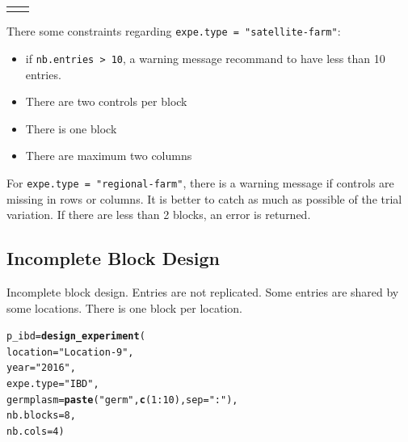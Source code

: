 \documentclass{book}\usepackage[]{graphicx}\usepackage[]{color}
\makeatletter
\newcommand{\hlnum}[1]{\textcolor[rgb]{0.686,0.059,0.569}{#1}}%
\newcommand{\hlstr}[1]{\textcolor[rgb]{0.192,0.494,0.8}{#1}}%
\newcommand{\hlopt}[1]{\textcolor[rgb]{0,0,0}{#1}}%
\newcommand{\hlstd}[1]{\textcolor[rgb]{0.345,0.345,0.345}{#1}}%
\newcommand{\hlkwb}[1]{\textcolor[rgb]{0.69,0.353,0.396}{#1}}%
\newcommand{\hlkwc}[1]{\textcolor[rgb]{0.333,0.667,0.333}{#1}}%
\newcommand{\hlkwd}[1]{\textcolor[rgb]{0.737,0.353,0.396}{\textbf{#1}}}%
\newenvironment{kframe}{%
 \def\at@end@of@kframe{}%
 \ifinner\ifhmode%
  \def\at@end@of@kframe{\end{minipage}}%
  \begin{minipage}{\columnwidth}%
 \fi\fi%
 \def\FrameCommand##1{\hskip\@totalleftmargin \hskip-\fboxsep
 \colorbox{shadecolor}{##1}\hskip-\fboxsep
     \hskip-\linewidth \hskip-\@totalleftmargin \hskip\columnwidth}%
 \MakeFramed {\advance\hsize-\width
   \@totalleftmargin\z@ \linewidth\hsize
   \@setminipage}}%
 {\par\unskip\endMakeFramed%
 \at@end@of@kframe}
\newenvironment{knitrout}{}{} %
\makeatother
\begin{document}
\begin{center}
\begin{tabular}{cc}
\begin{knitrout}
{}



\end{knitrout}
\\
\end{tabular}
\end{center}

There some constraints regarding \texttt{expe.type = "satellite-farm"}:
\begin{itemize}
\item if \texttt{nb.entries > 10}, a warning message recommand to have less than 10 entries.
\item There are two controls per block
\item There is one block
\item There are maximum two columns
\end{itemize}

For \texttt{expe.type = "regional-farm"}, there is a warning message if controls are missing in rows or columns.
It is better to catch as much as possible of the trial variation.
If there are less than 2 blocks, an error is returned.

\subsection{Incomplete Block Design}
\label{ibd}

Incomplete block design.
Entries are not replicated. Some entries are shared by some locations.
There is one block per location.

\begin{knitrout}
\color{fgcolor}\begin{kframe}
\begin{alltt}
\hlstd{p_ibd} \hlkwb{=} \hlkwd{design_experiment}\hlstd{(}
  \hlkwc{location} \hlstd{=} \hlstr{"Location-9"}\hlstd{,}
  \hlkwc{year} \hlstd{=} \hlstr{"2016"}\hlstd{,}
  \hlkwc{expe.type} \hlstd{=} \hlstr{"IBD"}\hlstd{,}
  \hlkwc{germplasm} \hlstd{=} \hlkwd{paste}\hlstd{(}\hlstr{"germ"}\hlstd{,} \hlkwd{c}\hlstd{(}\hlnum{1}\hlopt{:}\hlnum{10}\hlstd{),} \hlkwc{sep} \hlstd{=} \hlstr{":"}\hlstd{),}
  \hlkwc{nb.blocks} \hlstd{=} \hlnum{8}\hlstd{,}
  \hlkwc{nb.cols} \hlstd{=} \hlnum{4}\hlstd{)}
\end{alltt}
\end{kframe}
\end{knitrout}
\end{document}
